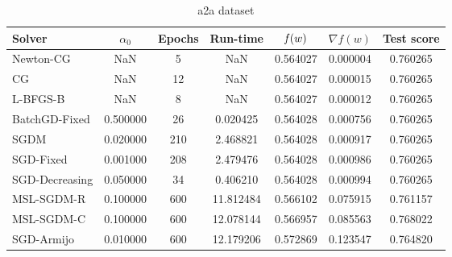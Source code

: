 \begin{table}
\caption{a2a dataset}
\label{tab:a2a-tab}
\centering
\begin{tabular}{lS[round-precision=3]S[drop-zero-decimal]S[round-precision=4]S[round-precision=6]S[exponent-mode=scientific]S[round-precision=6]}
\toprule
Solver & {$\alpha_0$} & {Epochs} & {Run-time} & {$\operatorname*{\mathit{f}}(w)$} & {$\nabla f(w)$} & {Test score} \\
\midrule
Newton-CG & NaN & 5 & NaN & 0.564027 & 0.000004 & 0.760265 \\
CG & NaN & 12 & NaN & 0.564027 & 0.000015 & 0.760265 \\
L-BFGS-B & NaN & 8 & NaN & 0.564027 & 0.000012 & 0.760265 \\
BatchGD-Fixed & 0.500000 & 26 & 0.020425 & 0.564028 & 0.000756 & 0.760265 \\
SGDM & 0.020000 & 210 & 2.468821 & 0.564028 & 0.000917 & 0.760265 \\
SGD-Fixed & 0.001000 & 208 & 2.479476 & 0.564028 & 0.000986 & 0.760265 \\
SGD-Decreasing & 0.050000 & 34 & 0.406210 & 0.564028 & 0.000994 & 0.760265 \\
MSL-SGDM-R & 0.100000 & 600 & 11.812484 & 0.566102 & 0.075915 & 0.761157 \\
MSL-SGDM-C & 0.100000 & 600 & 12.078144 & 0.566957 & 0.085563 & 0.768022 \\
SGD-Armijo & 0.010000 & 600 & 12.179206 & 0.572869 & 0.123547 & 0.764820 \\
\bottomrule
\end{tabular}
\end{table}

